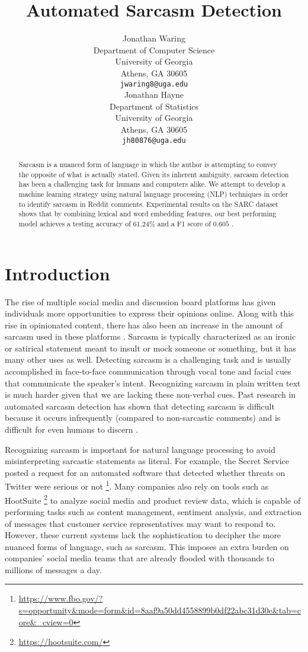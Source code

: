 \documentclass{article}
\title{Automated Sarcasm Detection}
\author{
  Jonathan Waring  \\
  Department of Computer Science\\
  University of Georgia\\
  Athens, GA 30605 \\
  \texttt{jwaring8@uga.edu} \\
  \And
  Jonathan Hayne \\
  Department of Statistics \\
  University of Georgia \\
  Athens, GA 30605 \\
  \texttt{jh80876@uga.edu}
}
\begin{document}

\maketitle

\begin{abstract}
Sarcasm is a nuanced form of language in which the author is attempting to convey the opposite of what is actually stated. Given its inherent ambiguity, sarcasm detection has been a challenging task for humans and computers alike. We attempt to develop a machine learning strategy using natural language processing (NLP) techniques in order to identify sarcasm in Reddit comments. Experimental results on the SARC dataset shows that by combining lexical and word embedding features, our best performing model achieves a testing accuracy of $61.24\%$ and a F1 score of $0.605$ . 
\end{abstract}

\section{Introduction}

The rise of multiple social media and discussion board platforms  has given individuals more opportunities to express their opinions online. Along with this rise in opinionated content, there has also been an increase in the amount of sarcasm used in these platforms \citep{derks2008emoticons}. Sarcasm is typically characterized as an ironic or satirical statement meant to insult or mock someone or something, but it has many other uses as well. Detecting sarcasm is a challenging task and is usually accomplished in face-to-face communication through vocal tone and facial cues that communicate the speaker’s intent. Recognizing sarcasm in plain written text is much harder given that we are lacking these non-verbal cues. Past research in automated sarcasm detection has shown that detecting sarcasm is difficult because it occurs infrequently (compared to non-sarcastic comments) and is difficult for even humans to discern \citep{wallace2014humans}. 

Recognizing sarcasm is important for natural language processing to avoid misinterpreting sarcastic statements as literal. For example, the Secret Service posted a request for an automated software that detected whether threats on Twitter were serious or not \footnote{\url{https://www.fbo.gov/?s=opportunity&mode=form&id=8aaf9a50dd4558899b0df22abc31d30e&tab=core&_cview=0}}. Many companies also rely on tools such as HootSuite \footnote{\url{https://hootsuite.com/}} to analyze social media and product review data, which is capable of performing tasks such as content management, sentiment analysis, and extraction of messages that customer service representatives may want to respond to. However, these current systems lack the sophistication to decipher the more nuanced forms of language, such as sarcasm. This imposes an extra burden on companies' social media teams that are already flooded with thousands to millions of messages a day. 
\end{document}
